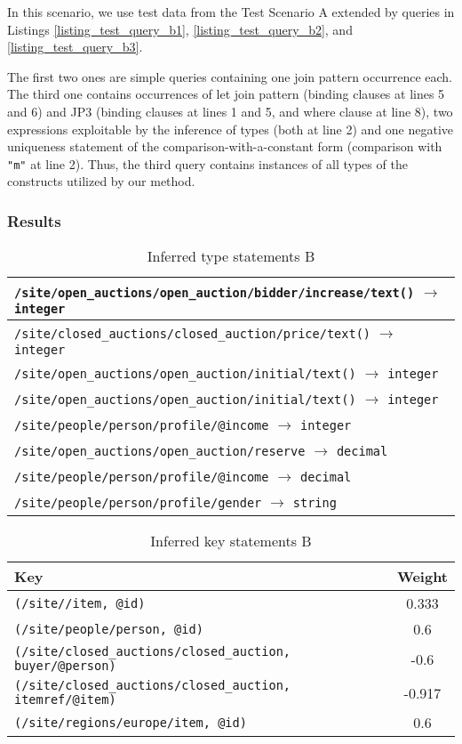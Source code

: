In this scenario, we use test data from the Test Scenario A extended by queries in Listings \ref{listing_test_query_b1}, \ref{listing_test_query_b2}, and \ref{listing_test_query_b3}.

The first two ones are simple queries containing one join pattern occurrence each. The third one contains occurrences of let join pattern (binding clauses at lines 5 and 6) and JP3 (binding clauses at lines 1 and 5, and where clause at line 8), two expressions exploitable by the inference of types (both at line 2) and one negative uniqueness statement of the comparison-with-a-constant form (comparison with \texttt{"m"} at line 2). Thus, the third query contains instances of all types of the constructs utilized by our method.

\subsubsection{Results}

\begin{table}
\begin{tabular}{|l|}
\hline
\texttt{/site/open\_auctions/open\_auction/bidder/increase/text()} $\rightarrow$ \texttt{integer} \\ \hline
\texttt{/site/closed\_auctions/closed\_auction/price/text()} $\rightarrow$ \texttt{integer} \\ \hline
\texttt{/site/open\_auctions/open\_auction/initial/text()} $\rightarrow$ \texttt{integer} \\ \hline
\texttt{/site/open\_auctions/open\_auction/initial/text()} $\rightarrow$ \texttt{integer} \\ \hline
\texttt{/site/people/person/profile/@income} $\rightarrow$ \texttt{integer} \\ \hline
\texttt{/site/open\_auctions/open\_auction/reserve} $\rightarrow$ \texttt{decimal} \\ \hline
\texttt{/site/people/person/profile/@income} $\rightarrow$ \texttt{decimal} \\ \hline
\texttt{/site/people/person/profile/gender} $\rightarrow$ \texttt{string} \\ \hline
\end{tabular}
\caption{Inferred type statements B}
\label{TAB_inferred_types_b}
\end{table}

\begin{table}
\begin{tabular}{|l|c|}
\hline
\textbf{Key} & \textbf{Weight} \\ \hline \hline
\texttt{(/site//item, {@id})} & 0.333 \\ \hline
\texttt{(/site/people/person, {@id})} & 0.6 \\ \hline
\texttt{(/site/closed\_auctions/closed\_auction, {buyer/@person})} & -0.6 \\ \hline
\texttt{(/site/closed\_auctions/closed\_auction, {itemref/@item})} & -0.917 \\ \hline
\texttt{(/site/regions/europe/item, {@id})} & 0.6 \\ \hline
\end{tabular}
\caption{Inferred key statements B}
\label{TAB_inferred_keys_b}
\end{table}

